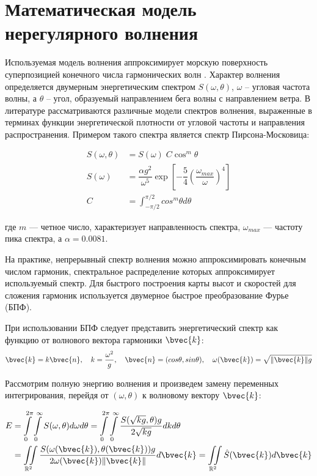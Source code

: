 \section{Математическая модель нерегулярного волнения}

Используемая модель волнения аппроксимирует морскую поверхность суперпозицией конечного числа гармонических волн \citep{lopatuhin2004}. Характер волнения определяется двумерным энергетическим спектром $S(\omega, \theta)$, $\omega$ -- угловая частота волны, а $\theta$ -- угол, образуемый направлением бега волны с направлением ветра. В литературе \citep{lopatuhin2004} рассматриваются различные модели спектров волнения, выраженные в терминах функции энергетической плотности от угловой частоты и направления распространения. Примером такого спектра является спектр Пирсона-Московица:

\begin{equation}
	\label{envmath2:spectra}
	\begin{split}
	S(\omega, \theta) &= S(\omega) \; C \cos^m\theta \\
	S(\omega) &= \dfrac{\alpha g^2}{\omega^5} \exp \left[ 
	  -\dfrac{5}{4} \left( \dfrac{\omega_{max}}{\omega} \right)^{4} 
	\right]  \\
	C &= \int_{-\pi/2}^{\pi/2} cos^m\theta d\theta
	\end{split}
\end{equation}

где $m$ --- четное число, характеризует направленность спектра, $\omega_{max}$ --- частоту пика спектра, а $\alpha = 0.0081$.

На практике, непрерывный спектр волнения можно аппроксимировать конечным числом гармоник, спектральное распределение которых аппроксимирует используемый спектр. Для быстрого построения карты высот и скоростей для сложения гармоник используется двумерное быстрое преобразование Фурье (БПФ).
 
При использовании БПФ следует представить энергетический спектр как функцию от волнового вектора гармоники $\bvec{k}$:
$$ \bvec{k} = k\bvec{n},\quad 
k = \frac{\omega^2}{g} ,\quad 
\bvec{n}=(cos \theta, sin \theta), \quad 
\omega(\bvec{k}) = \sqrt{\lVert \bvec{k} \rVert g} $$

Рассмотрим полную энергию волнения и произведем замену переменных интегрирования, перейдя от $(\omega, \theta)$ к волновому вектору $\bvec{k}$:

\begin{equation}
	\begin{split}
	E &= \int\limits_0^{2\pi}
		 \int\limits_0^\infty S(\omega, \theta) d\omega d\theta
	  = \int\limits_0^{2\pi}
		 \int\limits_0^\infty 
			 \frac {S(\sqrt{kg}, \theta)g} {2\sqrt{kg}} dk d\theta\\
	  &= \iint\limits_{\mathbb{R}^2}
			 \frac{S(\omega(\bvec{k}), \theta(\bvec{k})) g}
				  {2\omega(\bvec{k}) \lVert \bvec{k} \rVert} d\bvec{k}
	  = \iint\limits_{\mathbb{R}^2} \hat{S}(\bvec{k})d\bvec{k}
	\end{split}
\end{equation}

